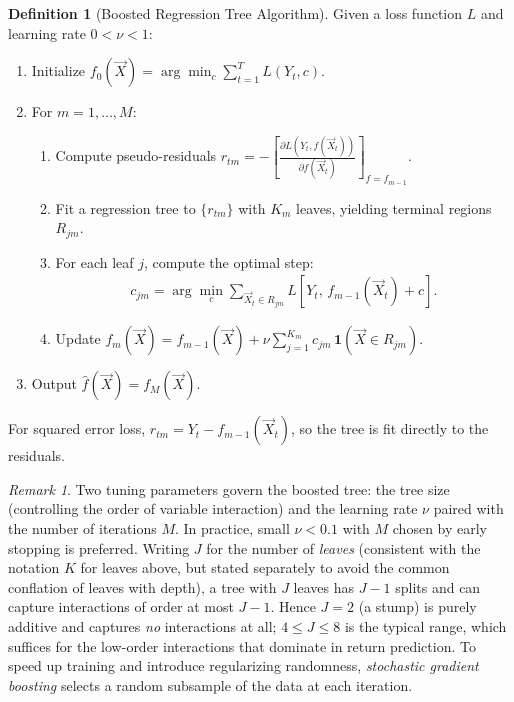 \documentclass[11pt]{article}
\theoremstyle{definition}
\newtheorem{definition}{Definition}[section]
\theoremstyle{plain}
\theoremstyle{remark}
\newtheorem{remark}{Remark}[section]
\begin{document}
\begin{definition}[Boosted Regression Tree Algorithm]
    Given a loss function $L$ and learning rate $0 < \nu < 1$:
    \begin{enumerate}
        \item Initialize $f_0(\vec{X}) = \arg\min_c \sum_{t=1}^T L(Y_t, c)$.
        \item For $m = 1, \dots, M$:
        \begin{enumerate}
            \item Compute pseudo-residuals $r_{tm} = -\left[\frac{\partial L(Y_t, f(\vec{X}_t))}{\partial f(\vec{X}_t)}\right]_{f = f_{m-1}}$.
            \item Fit a regression tree to $\{r_{tm}\}$ with $K_m$ leaves, yielding terminal regions $R_{jm}$.
            \item For each leaf $j$, compute the optimal step:
            \begin{align}
                c_{jm} = \arg\min_c \sum_{\vec{X}_t \in R_{jm}} L\!\left[Y_t,\, f_{m-1}(\vec{X}_t) + c\right].
            \end{align}
            \item Update $f_m(\vec{X}) = f_{m-1}(\vec{X}) + \nu \sum_{j=1}^{K_m} c_{jm}\,\mathbf{1}(\vec{X} \in R_{jm})$.
        \end{enumerate}
        \item Output $\hat{f}(\vec{X}) = f_M(\vec{X})$.
    \end{enumerate}
    For squared error loss, $r_{tm} = Y_t - f_{m-1}(\vec{X}_t)$, so the tree is fit directly to the residuals.
\end{definition}

\begin{remark}
    Two tuning parameters govern the boosted tree: the tree size (controlling the order of variable interaction) and the learning rate $\nu$ paired with the number of iterations $M$. In practice, small $\nu < 0.1$ with $M$ chosen by early stopping is preferred. Writing $J$ for the number of \emph{leaves} (consistent with the notation $K$ for leaves above, but stated separately to avoid the common conflation of leaves with depth), a tree with $J$ leaves has $J-1$ splits and can capture interactions of order at most $J-1$. Hence $J=2$ (a stump) is purely additive and captures \emph{no} interactions at all; $4 \leq J \leq 8$ is the typical range, which suffices for the low-order interactions that dominate in return prediction. To speed up training and introduce regularizing randomness, \emph{stochastic gradient boosting} selects a random subsample of the data at each iteration.
\end{remark}
\end{document}
